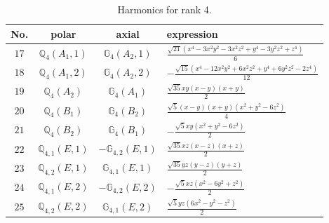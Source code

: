 \documentclass[fleqn,8pt,landscape]{jsarticle}
\begin{document}
\begin{table}[ht!]
\begin{center}
\caption{Harmonics for rank 4.}
\renewcommand{\arraystretch}{1.3}
\begin{tabular}{cccl} \hline \hline
No. & polar & axial & expression \\ \hline
$ 17 $ & $ \mathbb{Q}_{4}(A_{1},1) $ & $ \mathbb{G}_{4}(A_{2},1) $ & $ \frac{\sqrt{21} \left(x^{4} - 3 x^{2} y^{2} - 3 x^{2} z^{2} + y^{4} - 3 y^{2} z^{2} + z^{4}\right)}{6} $ \\
$ 18 $ & $ \mathbb{Q}_{4}(A_{1},2) $ & $ \mathbb{G}_{4}(A_{2},2) $ & $ - \frac{\sqrt{15} \left(x^{4} - 12 x^{2} y^{2} + 6 x^{2} z^{2} + y^{4} + 6 y^{2} z^{2} - 2 z^{4}\right)}{12} $ \\
$ 19 $ & $ \mathbb{Q}_{4}(A_{2}) $ & $ \mathbb{G}_{4}(A_{1}) $ & $ \frac{\sqrt{35} x y \left(x - y\right) \left(x + y\right)}{2} $ \\
$ 20 $ & $ \mathbb{Q}_{4}(B_{1}) $ & $ \mathbb{G}_{4}(B_{2}) $ & $ \frac{\sqrt{5} \left(x - y\right) \left(x + y\right) \left(x^{2} + y^{2} - 6 z^{2}\right)}{4} $ \\
$ 21 $ & $ \mathbb{Q}_{4}(B_{2}) $ & $ \mathbb{G}_{4}(B_{1}) $ & $ - \frac{\sqrt{5} x y \left(x^{2} + y^{2} - 6 z^{2}\right)}{2} $ \\
$ 22 $ & $ \mathbb{Q}_{4,1}(E,1) $ & $ -\mathbb{G}_{4,2}(E,1) $ & $ \frac{\sqrt{35} x z \left(x - z\right) \left(x + z\right)}{2} $ \\
$ 23 $ & $ \mathbb{Q}_{4,2}(E,1) $ & $ \mathbb{G}_{4,1}(E,1) $ & $ \frac{\sqrt{35} y z \left(y - z\right) \left(y + z\right)}{2} $ \\
$ 24 $ & $ \mathbb{Q}_{4,1}(E,2) $ & $ -\mathbb{G}_{4,2}(E,2) $ & $ - \frac{\sqrt{5} x z \left(x^{2} - 6 y^{2} + z^{2}\right)}{2} $ \\
$ 25 $ & $ \mathbb{Q}_{4,2}(E,2) $ & $ \mathbb{G}_{4,1}(E,2) $ & $ \frac{\sqrt{5} y z \left(6 x^{2} - y^{2} - z^{2}\right)}{2} $ \\
 \hline \hline
\end{tabular}
\end{center}
\end{table}
\end{document}
